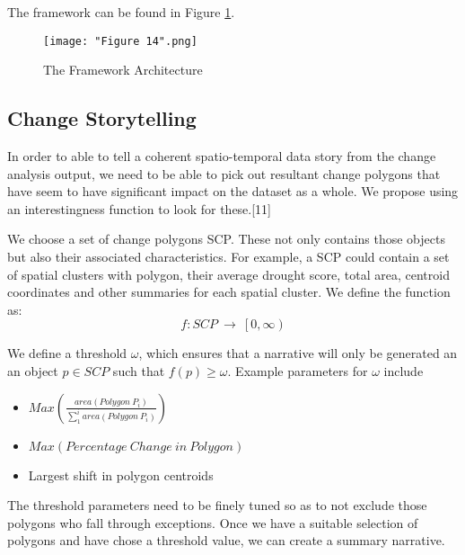 \documentclass[conference]{IEEEtran}
\begin{document}
The framework can be found in Figure \ref{Figure 1}.

\begin{figure}[ht]
\centerline{\texttt{[image: "Figure 14".png]}}
\caption{The Framework Architecture}
\label{Figure 1}
\end{figure}
%



\subsection{Change Storytelling}

In order to able to tell a coherent spatio-temporal data story from the change analysis output, we need to be able to pick out resultant change polygons that have seem to have significant impact on the dataset as a whole. We propose using an interestingness function to look for these.[11]

We choose a set of change polygons SCP. These not only contains those objects but also their associated characteristics. For example, a SCP could contain a set of spatial clusters with polygon, their average drought score, total area, centroid coordinates and other summaries for each spatial cluster. We define the function as:
\[f:SCP\ \rightarrow\ \left[0\right.,\left.\infty\right)\]

We define a threshold $\omega$, which ensures that a narrative will only be generated an an object $p \in SCP$ such that $f(p) \ge \omega$. Example parameters for $\omega$ include  

\begin{itemize}
\item $Max\left(\frac{area\left(Polygon\ P_i\right)}{\sum_{1}^{i}area\left(Polygon\ P_i\right)}\right)$
\item $Max\left(Percentage\ Change\ in\ Polygon\right)$
\item Largest shift in polygon centroids
\end{itemize}

The threshold parameters need to be finely tuned so as to not exclude those polygons who fall through exceptions. Once we have a suitable selection of polygons and have chose a threshold value, we can create a summary narrative. 
\end{document}
